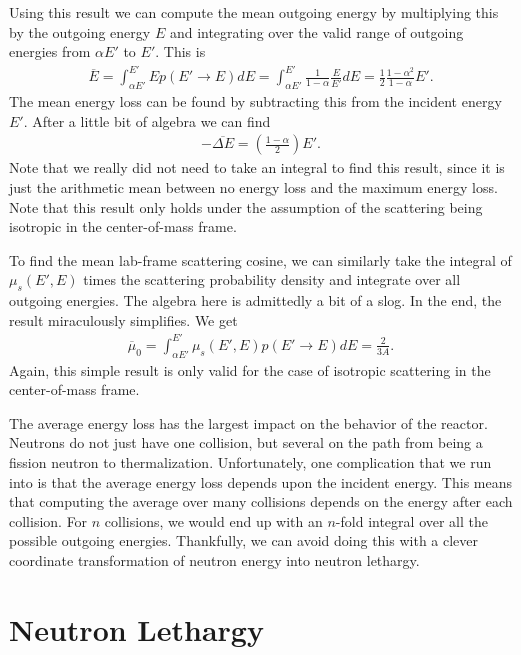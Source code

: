 Using this result we can compute the mean outgoing energy by multiplying this by the outgoing energy $E$ and integrating over the valid range of outgoing energies from $\alpha E'$ to $E'$. This is
\begin{align}
  \overline{E} = \int_{\alpha E'}^{E'} E p(E' \rightarrow E ) dE =  \int_{\alpha E'}^{E'} \frac{1}{1-\alpha} \frac{E}{E'} dE = \frac{1}{2} \frac{ 1 - \alpha^2 }{ 1 - \alpha } E' .
\end{align}
The mean energy loss can be found by subtracting this from the incident energy $E'$. After a little bit of algebra we can find
\begin{align}
  -\overline{ \Delta E } = \left( \frac{1 - \alpha}{2} \right) E' .
\end{align}
Note that we really did not need to take an integral to find this result, since it is just the arithmetic mean between no energy loss and the maximum energy loss. Note that this result only holds under the assumption of the scattering being isotropic in the center-of-mass frame.

To find the mean lab-frame scattering cosine, we can similarly take the integral of $\mu_s(E',E)$ times the scattering probability density and integrate over all outgoing energies. The algebra here is admittedly a bit of a slog. In the end, the result miraculously simplifies. We get
\begin{align}
  \overline{\mu}_0 = \int_{\alpha E'}^{E'} \mu_s(E',E) p(E' \rightarrow E ) dE =  \frac{2}{3A} .
\end{align}
Again, this simple result is only valid for the case of isotropic scattering in the center-of-mass frame.

The average energy loss has the largest impact on the behavior of the reactor. Neutrons do not just have one collision, but several on the path from being a fission neutron to thermalization. Unfortunately, one complication that we run into is that the average energy loss depends upon the incident energy. This means that computing the average over many collisions depends on the energy after each collision. For $n$ collisions, we would end up with an $n$-fold integral over all the possible outgoing energies. Thankfully, we can avoid doing this with a clever coordinate transformation of neutron energy into neutron lethargy.

\section{Neutron Lethargy}


